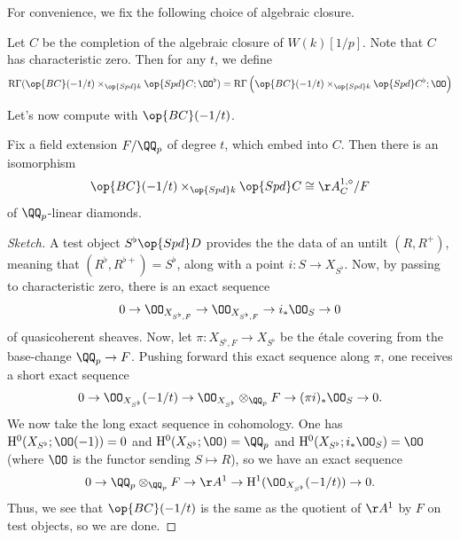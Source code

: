 \documentclass[../notes.tex]{subfiles}
\begin{document}
For convenience, we fix the following choice of algebraic closure.
\begin{notation}
	Let $C$ be the completion of the algebraic closure of $W(k)[1/p]$. Note that $C$ has characteristic zero. Then for any $t$, we define
	\[\mathrm R\Gamma(\op{BC}(-1/t)\times_{\op{Spd}k}\op{Spd}C;\OO^\flat)=\mathrm R\Gamma\left(\op{BC}(-1/t)\times_{\op{Spd}k}\op{Spd}C^\flat;\OO\right)\]
\end{notation}
Let's now compute with $\op{BC}(-1/t)$.
\begin{proposition} \label{prob:bc-as-quotient}
	Fix a field extension $F/\QQ_p$ of degree $t$, which embed into $C$. Then there is an isomorphism
	\[\op{BC}(-1/t)\times_{\op{Spd}k}\op{Spd}C\cong\AA^{1,\diamond}_C/F\]
	of $\QQ_p$-linear diamonds.
\end{proposition}
\begin{proof}[Sketch]
	A test object $S^\flat\op{Spd}D$ provides the the data of an untilt $(R,R^+)$, meaning that $(R^\flat,R^{\flat+})=S^\flat$, along with a point $i\colon S\to X_{S^\flat}$. Now, by passing to characteristic zero, there is an exact sequence
	\[0\to\OO_{X_{S^\flat,F}}\to\OO_{X_{S^\flat,F}}\to i_*\OO_S\to0\]
	of quasicoherent sheaves. Now, let $\pi\colon X_{S^\flat,F}\to X_{S^\flat}$ be the \'etale covering from the base-change $\QQ_p\to F$. Pushing forward this exact sequence along $\pi$, one receives a short exact sequence
	\[0\to\OO_{X_{S^\flat}}(-1/t)\to\OO_{X_{S^\flat}}\otimes_{\QQ_p}F\to(\pi i)_*\OO_S\to0.\]
	We now take the long exact sequence in cohomology. One has $\mathrm H^0(X_{S^\flat};\OO(-1))=0$ and $\mathrm H^0(X_{S^\flat};\OO)=\QQ_p$ and $\mathrm H^0(X_{S^\flat};i_*\OO_S)=\OO$ (where $\OO$ is the functor sending $S\mapsto R$), so we have an exact sequence
	\[0\to \QQ_p\otimes_{\QQ_p}F\to\AA^1\to\mathrm H^1(\OO_{X_{S^\flat}}(-1/t))\to0.\]
	Thus, we see that $\op{BC}(-1/t)$ is the same as the quotient of $\AA^1$ by $F$ on test objects, so we are done.
\end{proof}
\end{document}
